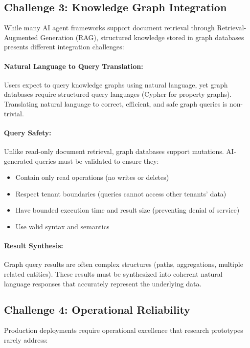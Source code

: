 \documentclass[a4paper,twoside]{sapthesis}
\begin{document}
\subsection{Challenge 3: Knowledge Graph Integration}

While many AI agent frameworks support document retrieval through Retrieval-Augmented Generation (RAG), structured knowledge stored in graph databases presents different integration challenges:

\paragraph{Natural Language to Query Translation:}
Users expect to query knowledge graphs using natural language, yet graph databases require structured query languages (Cypher for property graphs). Translating natural language to correct, efficient, and safe graph queries is non-trivial.

\paragraph{Query Safety:}
Unlike read-only document retrieval, graph databases support mutations. AI-generated queries must be validated to ensure they:
\begin{itemize}
    \item Contain only read operations (no writes or deletes)
    \item Respect tenant boundaries (queries cannot access other tenants' data)
    \item Have bounded execution time and result size (preventing denial of service)
    \item Use valid syntax and semantics
\end{itemize}

\paragraph{Result Synthesis:}
Graph query results are often complex structures (paths, aggregations, multiple related entities). These results must be synthesized into coherent natural language responses that accurately represent the underlying data.

\subsection{Challenge 4: Operational Reliability}

Production deployments require operational excellence that research prototypes rarely address:
\end{document}
